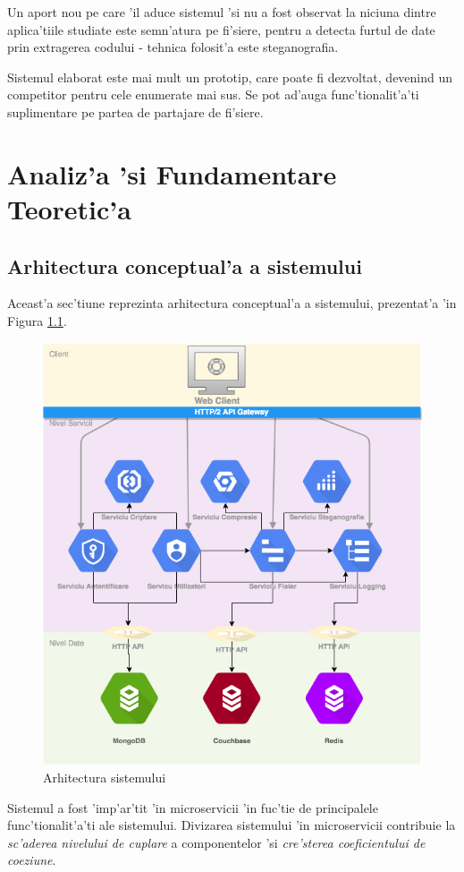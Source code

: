 \documentclass[12pt,a4paper,twoside]{report}
\begin{document}
Un aport nou pe care 'il aduce sistemul 'si nu a fost observat la niciuna dintre aplica'tiile studiate este semn'atura pe fi'siere, pentru a detecta furtul de date prin extragerea codului - tehnica folosit'a este steganografia.

Sistemul elaborat este mai mult un prototip, care poate fi dezvoltat, devenind un competitor pentru cele enumerate mai sus. Se pot ad'auga func'tionalit'a'ti suplimentare pe partea de partajare de fi'siere. 


\chapter{Analiz'a 'si Fundamentare Teoretic'a}\label{ch:analysis}
\section{Arhitectura conceptual'a a sistemului}
Aceast'a sec'tiune reprezinta arhitectura conceptual'a a sistemului,  prezentat'a  'in Figura \ref{diagrama_system}.

\begin{figure}[H]
\begin{center}
\advance\leftskip-3cm
\advance\rightskip-3cm
\includegraphics[keepaspectratio=true,scale=0.45]{img/diagrama_system.png}
\caption{Arhitectura sistemului}
\label{diagrama_system}
\end{center}
\end{figure}
 Sistemul a fost 'imp'ar'tit 'in microservicii 'in fuc'tie de principalele func'tionalit'a'ti ale sistemului. Divizarea sistemului 'in microservicii contribuie la \textit{sc'aderea nivelului de cuplare} a componentelor 'si \textit{cre'sterea coeficientului de coeziune}.
\end{document}

